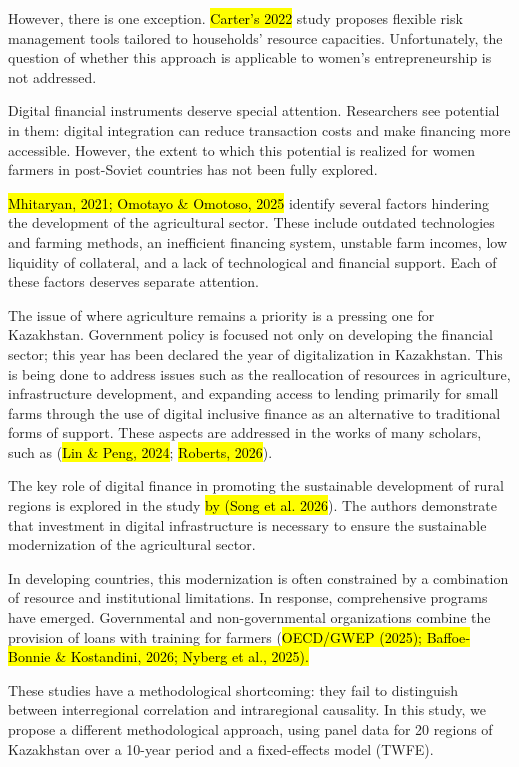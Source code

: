 However, there is one exception. \hl{Carter's 2022} study proposes
flexible risk management tools tailored to households' resource
capacities. Unfortunately, the question of whether this approach is
applicable to women's entrepreneurship is not addressed.

Digital financial instruments deserve special attention. Researchers see
potential in them: digital integration can reduce transaction costs and
make financing more accessible. However, the extent to which this
potential is realized for women farmers in post-Soviet countries has not
been fully explored.

\hl{Mhitaryan, 2021; Omotayo \& Omotoso, 2025} identify several factors
hindering the development of the agricultural sector. These include
outdated technologies and farming methods, an inefficient financing
system, unstable farm incomes, low liquidity of collateral, and a lack
of technological and financial support. Each of these factors deserves
separate attention.

The issue of where agriculture remains a priority is a pressing one for
Kazakhstan. Government policy is focused not only on developing the
financial sector; this year has been declared the year of digitalization
in Kazakhstan. This is being done to address issues such as the
reallocation of resources in agriculture, infrastructure development,
and expanding access to lending primarily for small farms through the
use of digital inclusive finance as an alternative to traditional forms
of support. These aspects are addressed in the works of many scholars,
such as (\hl{Lin \& Peng, 2024}; \hl{Roberts, 2026}).

The key role of digital finance in promoting the sustainable development
of rural regions is explored in the study \hl{by (Song et al. 2026}).
The authors demonstrate that investment in digital infrastructure is
necessary to ensure the sustainable modernization of the agricultural
sector.

In developing countries, this modernization is often constrained by a
combination of resource and institutional limitations. In response,
comprehensive programs have emerged. Governmental and non-governmental
organizations combine the provision of loans with training for farmers
(\hl{OECD/GWEP (2025); Baffoe‐Bonnie \& Kostandini, 2026; Nyberg et al.,
2025).}

These studies have a methodological shortcoming: they fail to
distinguish between interregional correlation and intraregional
causality. In this study, we propose a different methodological
approach, using panel data for 20 regions of Kazakhstan over a 10-year
period and a fixed-effects model (TWFE).

